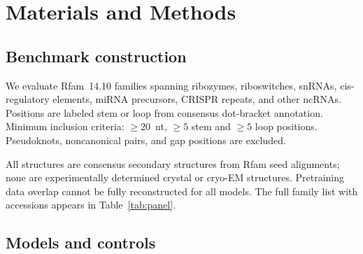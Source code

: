 \documentclass[11pt]{article}
\begin{document}
\section{Materials and Methods}
\label{sec:methods}

\subsection{Benchmark construction}
\label{sec:benchmark}

We evaluate \panelN{} Rfam~14.10 families \citep{kalvari2021rfam} spanning ribozymes, riboswitches, snRNAs,
cis-regulatory elements, miRNA precursors, CRISPR repeats, and other ncRNAs.
Positions are labeled stem or loop from consensus dot-bracket annotation.
Minimum inclusion criteria: $\geq 20$~nt, $\geq 5$ stem and $\geq 5$ loop
positions. Pseudoknots, noncanonical pairs, and gap positions are excluded.

All structures are consensus secondary structures from Rfam seed alignments;
none are experimentally determined crystal or cryo-EM structures. Pretraining
data overlap cannot be fully reconstructed for all models. The full family
list with accessions appears in Table~\ref{tab:panel}.

\subsection{Models and controls}
\label{sec:models}
\end{document}
